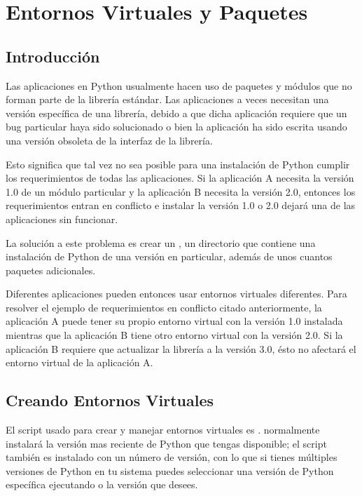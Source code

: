 \documentclass[a5paper,10pt,spanish]{sphinxmanual}
\begin{document}
\chapter{Entornos Virtuales y Paquetes}
\label{\detokenize{tutorial/venv:virtual-environments-and-packages}}\label{\detokenize{tutorial/venv:tut-venv}}\label{\detokenize{tutorial/venv::doc}}

\section{Introducción}
\label{\detokenize{tutorial/venv:introduction}}
\sphinxAtStartPar
Las aplicaciones en Python usualmente hacen uso de paquetes y módulos que no forman parte de la librería estándar. Las aplicaciones a veces necesitan una versión específica de una librería, debido a que dicha aplicación requiere que un bug particular haya sido solucionado o bien la aplicación ha sido escrita usando una versión obsoleta de la interfaz de la librería.

\sphinxAtStartPar
Esto significa que tal vez no sea posible para una instalación de Python cumplir los requerimientos de todas las aplicaciones. Si la aplicación A necesita la versión 1.0 de un módulo particular y la aplicación B necesita la versión 2.0, entonces los requerimientos entran en conflicto e instalar la versión 1.0 o 2.0 dejará una de las aplicaciones sin funcionar.

\sphinxAtStartPar
La solución a este problema es crear un {\hyperref[\detokenize{glossary:term-virtual-environment}]{}},  un directorio que contiene una instalación de Python de una versión en particular,  además de unos cuantos paquetes adicionales.

\sphinxAtStartPar
Diferentes aplicaciones pueden entonces usar entornos virtuales diferentes.  Para resolver el ejemplo de requerimientos en conflicto citado anteriormente, la aplicación A puede tener su propio entorno virtual con la versión 1.0 instalada mientras que la aplicación B tiene otro entorno virtual con la versión 2.0.  Si la aplicación B requiere que actualizar la librería a la versión 3.0, ésto no afectará el entorno virtual de la aplicación A.


\section{Creando Entornos Virtuales}
\label{\detokenize{tutorial/venv:creating-virtual-environments}}
\sphinxAtStartPar
El script usado para crear y manejar entornos virtuales es .   normalmente instalará la versión mas reciente de Python que tengas disponible; el script también es instalado con un número de versión, con lo que si tienes múltiples versiones de Python en tu sistema puedes seleccionar una versión de Python específica ejecutando  o la versión que desees.
\end{document}
